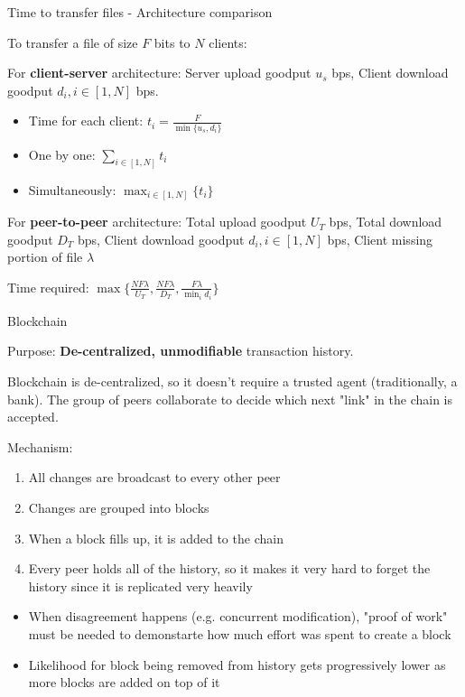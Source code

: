\begin{theorem}
    {Time to transfer files - Architecture comparison}

    To transfer a file of size $F$ bits to $N$ clients:

    For \textbf{client-server} architecture: Server upload goodput $u_s$ bps, Client download goodput $d_i, i \in [1, N]$ bps.

    \begin{itemize}
        \item Time for each client: $t_i = \frac{F}{\min\{u_s, d_i\}}$
        \item One by one: $\sum_{i \in [1, N]} t_i$
        \item Simultaneously: $\max_{i \in [1, N]} \{t_i\}$
    \end{itemize}

    For \textbf{peer-to-peer} architecture: Total upload goodput $U_T$ bps, Total download goodput $D_T$ bps, Client download goodput $d_i, i \in [1, N]$ bps, Client missing portion of file $\lambda$

    Time required: $\max\{\frac{NF\lambda}{U_T}, \frac{NF\lambda}{D_T} , \frac{F\lambda}{\min_{i}d_i}\}$

\end{theorem}

\begin{theorem}
    {Blockchain}

    Purpose: \textbf{De-centralized, unmodifiable} transaction history.

    Blockchain is de-centralized, so it doesn't require a trusted agent (traditionally, a bank). The group of peers collaborate to decide which next "link" in the chain is accepted.

    Mechanism:
    \begin{enumerate}
        \item All changes are broadcast to every other peer
        \item Changes are grouped into blocks
        \item When a block fills up, it is added to the chain
        \item Every peer holds all of the history, so it makes it very hard to forget the history since it is replicated very heavily
    \end{enumerate}
    \begin{itemize}
        \item When disagreement happens (e.g. concurrent modification), "proof of work" must be needed to demonstarte how much effort was spent to create a block
        \item Likelihood for block being removed from history gets progressively lower as more blocks are added on top of it
    \end{itemize}
\end{theorem}